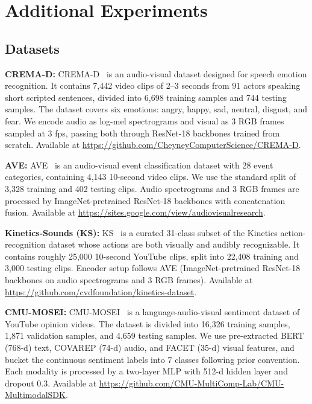 \documentclass{article} %
\begin{document}

\section{Additional Experiments}
\label{app:datasets}

\subsection{Datasets}
\label{app:datasets_list}

\noindent\textbf{CREMA-D:} CREMA-D~\citep{cao2014cremad} is an audio-visual dataset designed for speech emotion recognition. It contains 7{,}442 video clips of 2--3 seconds from 91 actors speaking short scripted sentences, divided into 6{,}698 training samples and 744 testing samples. The dataset covers six emotions: angry, happy, sad, neutral, disgust, and fear. We encode audio as log-mel spectrograms and visual as 3 RGB frames sampled at 3 fps, passing both through ResNet-18 backbones trained from scratch. Available at \url{https://github.com/CheyneyComputerScience/CREMA-D}.

\noindent\textbf{AVE:} AVE~\citep{tian2018ave} is an audio-visual event classification dataset with 28 event categories, containing 4{,}143 10-second video clips. We use the standard split of 3{,}328 training and 402 testing clips. Audio spectrograms and 3 RGB frames are processed by ImageNet-pretrained ResNet-18 backbones with concatenation fusion. Available at \url{https://sites.google.com/view/audiovisualresearch}.

\noindent\textbf{Kinetics-Sounds (KS):} KS~\citep{arandjelovic2017kinetics} is a curated 31-class subset of the Kinetics action-recognition dataset whose actions are both visually and audibly recognizable. It contains roughly 25{,}000 10-second YouTube clips, split into 22{,}408 training and 3{,}000 testing clips. Encoder setup follows AVE (ImageNet-pretrained ResNet-18 backbones on audio spectrograms and 3 RGB frames). Available at \url{https://github.com/cvdfoundation/kinetics-dataset}.

\noindent\textbf{CMU-MOSEI:} CMU-MOSEI~\citep{zadeh2018mosei} is a language-audio-visual sentiment dataset of YouTube opinion videos. The dataset is divided into 16{,}326 training samples, 1{,}871 validation samples, and 4{,}659 testing samples. We use pre-extracted BERT (768-d) text, COVAREP (74-d) audio, and FACET (35-d) visual features, and bucket the continuous sentiment labels into 7 classes following prior convention. Each modality is processed by a two-layer MLP with 512-d hidden layer and dropout $0.3$. Available at \url{https://github.com/CMU-MultiComp-Lab/CMU-MultimodalSDK}.
\end{document}
